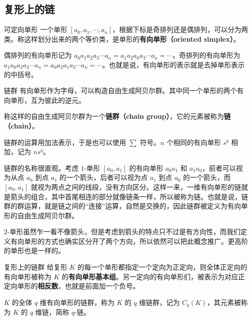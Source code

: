 



\subsection{复形上的链}

\begin{definition}{可定向单形}
一个单形 $[a_0, a_1, \cdots, a_n]$，根据下标是奇排列还是偶排列，可以分为两类。称这样划分出来的两个等价类，是单形的\textbf{有向单形（oriented simplex）}。

偶排列的有向单形记为 $a_0a_1a_2a_3\cdots a_n=a_1a_2a_0a_3\cdots a_n=\cdots$，奇排列的有向单形为 $a_1a_0a_2a_3\cdots a_n=a_0a_2a_1a_3\cdots a_n=\cdots$。也就是说，有向单形的表示就是去掉单形表示的中括号。
\end{definition}

\begin{definition}{链群}
有向单形作为字母，可以构造自由生成阿贝尔群。其中同一个单形的两个有向单形，互为彼此的逆元。

称这样的自由生成阿贝尔群为一个\textbf{链群（chain group）}，它的元素被称为\textbf{链（chain）}。

链群的运算用加法表示，于是也可以使用 $\sum$ 符号。$n$ 个相同的有向单形 $s^q$ 相加，记为 $ns^q$。
\end{definition}

链群的名称很直观。考虑 $1$-单形 $[a_0, a_1]$ 的有向单形 $a_0a_1$ 和 $a_1a_0$，前者可以视为从点 $a_0$ 到点 $a_1$ 的一个箭头，后者可以视为点 $a_1$ 到点 $a_0$ 的一个箭头，而 $[a_0, a_1]$ 就视为两点之间的线段，没有方向区分。这样一来，一维有向单形的链就是箭头的组合，其中首尾相连的部分就像链条一样，所以被称为链。也就是说，链群的群运算，就是链之间的“连接”运算，自然是交换的，因此链群被定义为有向单形的自由生成阿贝尔群。

$2$-单形虽然乍一看不像箭头，但是考虑到箭头的特点只不过是有方向性，而我们定义有向单形的方式也确实区分开了两个方向，所以依然可以把此概念推广。更高阶的单形也是一样的。

\begin{definition}{复形上的链群}
给复形 $K$ 的每一个单形都指定一个定向为正定向，则全体正定向的有向单形被称为 $K$ 的\textbf{有向单形基本组}。另一定向的有向单形们，被表示为对应正定向单形的\textbf{相反数}，也就是前面加一个负号。

$K$ 的全体 $q$ 维有向单形的链群，称为 $K$ 的 $q$ 维链群，记为 $C_q(K)$，其元素被称为 $K$ 的 $q$ 维链，简称 $q$-链。
\end{definition}

